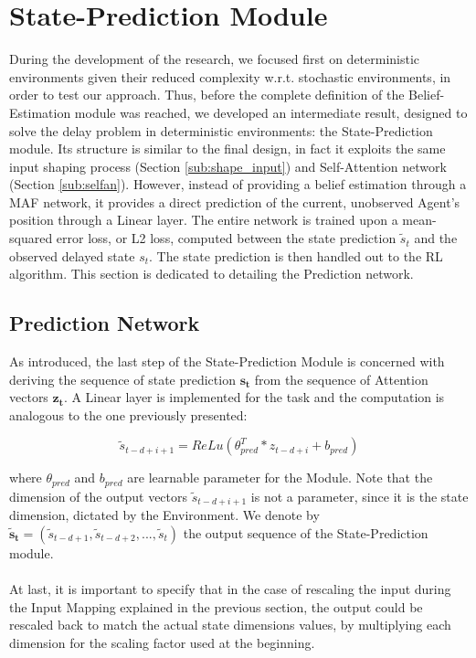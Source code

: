     \section{State-Prediction Module}
    \label{ow:deterministic_module}
        During the development of the research, we focused first on deterministic environments given their reduced complexity w.r.t. stochastic environments, in order to test our approach. Thus, before the complete definition of the Belief-Estimation module was reached, we developed an intermediate result, designed to solve the delay problem in deterministic environments: the State-Prediction module. Its structure is similar to the final design, in fact it exploits the same input shaping process (Section \ref{sub:shape_input}) and Self-Attention network (Section \ref{sub:selfan}). However, instead of providing a belief estimation through a MAF network, it provides a direct prediction of the current, unobserved Agent's position through a Linear layer. The entire network is trained upon a mean-squared error loss, or L2 loss, computed between the state prediction $\tilde{s}_t$ and the observed delayed state $s_t$. The state prediction is then handled out to the RL algorithm. This section is dedicated to detailing the Prediction network.
        
        \subsection{Prediction Network}
        \label{sub:pred_network}
            As introduced, the last step of the State-Prediction Module is concerned with deriving the sequence of state prediction $\mathbf{s_t}$ from the sequence of Attention vectors $\mathbf{z_t}$. A Linear layer is implemented for the task and the computation is analogous to the one previously presented:
            
            \[ \tilde{s}_{t-d+i+1} = ReLu \left( \theta_{pred}^{T} * z_{t-d+i} + b_{pred} \right)\]
            
            where $\theta_{pred}$ and $b_{pred}$ are learnable parameter for the Module. Note that the dimension of the output vectors $\tilde{s}_{t-d+i+1}$ is not a parameter, since it is the state dimension, dictated by the Environment. We denote by $\mathbf{\tilde{s}_t} = (\tilde{s}_{t-d+1}, \tilde{s}_{t-d+2}, ..., \tilde{s}_t)$ the output sequence of the State-Prediction module. 
            \\\\
            At last, it is important to specify that in the case of rescaling the input during the Input Mapping explained in the previous section, the output could be rescaled back to match the actual state dimensions values, by multiplying each dimension for the scaling factor used at the beginning. 
            
